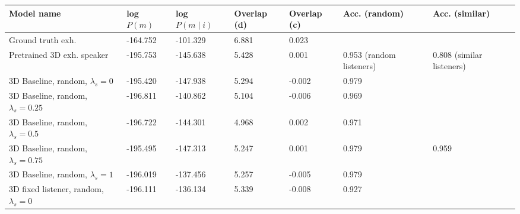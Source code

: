 \begin{table}[] 
	\begin{tabularx}{\textwidth}{|X|l|l|X|X|X|X|}
		\hline
		\textbf{Model name}                                    & \textbf{log $P(m)$} & \textbf{log $P(m \mid i)$} & \textbf{Overlap (d)} & \textbf{Overlap (c)} & \textbf{Acc. (random)} & \textbf{Acc. (similar)} \\ \hline
		Ground truth exh.       &      -164.752            &         -101.329               &       6.881             &      0.023               &                 &                \\ \hline
		Pretrained 3D exh. speaker                            &       -195.753            &         -145.638               &        5.428              &      0.001                & 0.953 (random listeners)                 & 0.808 (similar listeners)                 \\ \hline
		3D Baseline, random, $\lambda_s = 0$ &       -195.420            &    -147.938                    &           5.294            &      -0.002                &                 0.979                         &                                           \\ \hline
		3D Baseline, random, $\lambda_s = 0.25$     &     -196.811              &       -140.862                 &          5.104            &       -0.006               &          0.969                                &                                           \\ \hline
		3D Baseline, random, $\lambda_s = 0.5$   &         -196.722          &        -144.301                &        4.968              &          0.002            &                  0.971                      &                                           \\ \hline
		3D Baseline, random, $\lambda_s = 0.75$  &       -195.495        &           -147.313           &          5.247            &         0.001             & 0.979                                    &                        0.959                   \\ \hline
		3D Baseline, random, $\lambda_s = 1$   &      -196.019             &            -137.456             &        5.257              &          -0.005            &              0.979                            &                                           \\ \hline
		3D fixed listener, random, $\lambda_s = 0$&      -196.111          &     -136.134                  &             5.339         &         -0.008            &                   0.927                      &                                           \\ \hline

\end{tabularx}
\end{table}
